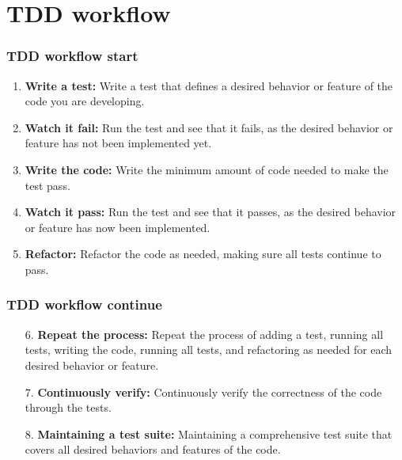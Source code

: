 \section{TDD workflow}

\begin{frame}
\frametitle{TDD workflow start}
\begin{enumerate}
\item \textbf{Write a test:} Write a test that defines a desired behavior or feature of the code you are developing.
\item \textbf{Watch it fail:} Run the test and see that it fails, as the desired behavior or feature has not been implemented yet.
\item \textbf{Write the code:} Write the minimum amount of code needed to make the test pass.
\item \textbf{Watch it pass:} Run the test and see that it passes, as the desired behavior or feature has now been implemented.
\item \textbf{Refactor:} Refactor the code as needed, making sure all tests continue to pass.
\end{enumerate}
\end{frame}

\begin{frame}
\frametitle{TDD workflow continue}
\begin{enumerate}
\item[6.] \textbf{Repeat the process:} Repeat the process of adding a test, running all tests, writing the code, running all tests, and refactoring as needed for each desired behavior or feature.
\item[7.] \textbf{Continuously verify:} Continuously verify the correctness of the code through the tests.
\item[8.] \textbf{Maintaining a test suite:} Maintaining a comprehensive test suite that covers all desired behaviors and features of the code.
\end{enumerate}
\end{frame}

